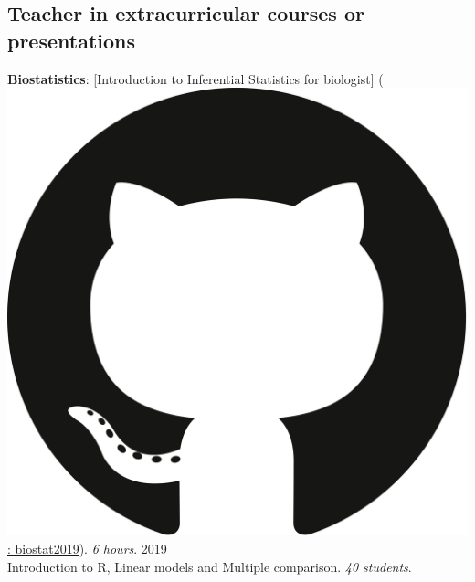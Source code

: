 \documentclass[margin,line]{res}
\begin{document}
\begin{resume}

\section{\sc Teacher in extracurricular courses or presentations}
{\bf Biostatistics}: [Introduction to Inferential Statistics for biologist] (\href{https://github.com/avallecam/biostat2019}{\includegraphics[scale=.004]{../figure/gh_logo.png}: biostat2019}). \textit{6 hours}. \hfill {2019}\\ Introduction to R, Linear models and Multiple comparison. \textit{40 students}. \\[4pt] 

\end{resume}
\end{document}
